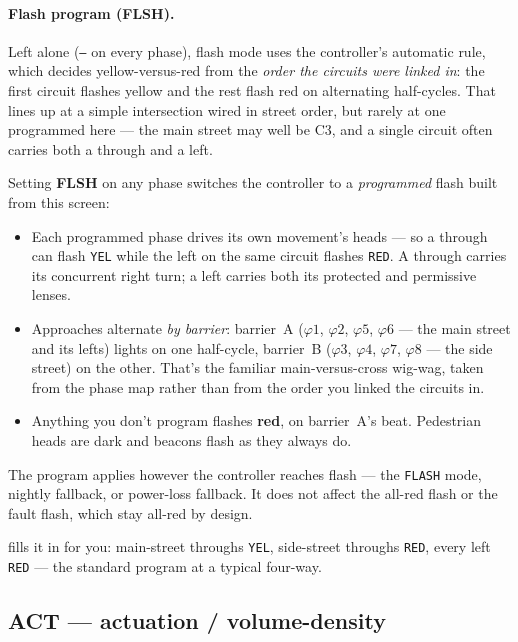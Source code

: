 \documentclass[11pt]{article}
\newcommand{\ph}[1]{\ensuremath{\varphi#1}}
\newcommand{\field}[1]{\textsf{\textbf{#1}}}
\newcommand{\key}[1]{\fcolorbox{inkhead}{gray!12}{\small\textsf{#1}}}
\begin{document}
\paragraph{Flash program (FLSH).}\label{sec:flashprog}
Left alone (\texttt{--} on every phase), flash mode uses the controller's
automatic rule, which decides yellow-versus-red from the \emph{order the circuits
were linked in}: the first circuit flashes yellow and the rest flash red on
alternating half-cycles. That lines up at a simple intersection wired in street
order, but rarely at one programmed here — the main street may well be C3, and a
single circuit often carries both a through and a left.

Setting \field{FLSH} on any phase switches the controller to a \emph{programmed}
flash built from this screen:

\begin{itemize}
  \item Each programmed phase drives its own movement's heads — so a through can
        flash \texttt{YEL} while the left on the same circuit flashes \texttt{RED}.
        A through carries its concurrent right turn; a left carries both its
        protected and permissive lenses.
  \item Approaches alternate \emph{by barrier}: barrier~A (\ph{1}, \ph{2},
        \ph{5}, \ph{6} — the main street and its lefts) lights on one half-cycle,
        barrier~B (\ph{3}, \ph{4}, \ph{7}, \ph{8} — the side street) on the
        other. That's the familiar main-versus-cross wig-wag, taken from the
        phase map rather than from the order you linked the circuits in.
  \item Anything you don't program flashes \textbf{red}, on barrier~A's beat.
        Pedestrian heads are dark and beacons flash as they always do.
\end{itemize}

The program applies however the controller reaches flash — the \texttt{FLASH}
mode, nightly fallback, or power-loss fallback. It does not affect the all-red
flash or the fault flash, which stay all-red by design.

\key{Load Std 8-Phase} fills it in for you: main-street throughs \texttt{YEL},
side-street throughs \texttt{RED}, every left \texttt{RED} --- the standard
program at a typical four-way.

\subsection{ACT — actuation / volume-density}\label{sec:act}
\end{document}
